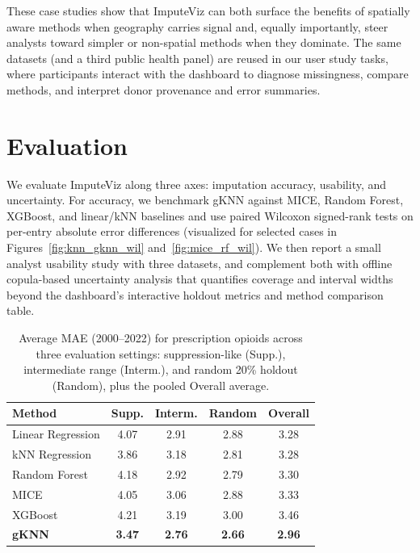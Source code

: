 \documentclass[review]{vgtc}
\newcommand{\gknn}{gKNN\xspace}
\newcommand{\tool}{ImputeViz\xspace}
\begin{document}
These case studies show that ImputeViz can both surface the benefits of spatially aware methods when geography carries signal and, equally importantly, steer analysts toward simpler or non-spatial methods when they dominate. The same datasets (and a third public health panel) are reused in our user study tasks, where participants interact with the dashboard to diagnose missingness, compare methods, and interpret donor provenance and error summaries.

\section{Evaluation}
\label{sec:evaluation}
We evaluate \tool along three axes: imputation accuracy, usability, and uncertainty. For accuracy, we benchmark gKNN against MICE, Random Forest, XGBoost, and linear/kNN baselines and use paired Wilcoxon signed-rank tests on per-entry absolute error differences (visualized for selected cases in Figures~\ref{fig:knn_gknn_wil} and~\ref{fig:mice_rf_wil}). We then report a small analyst usability study with three datasets, and complement both with offline copula-based uncertainty analysis that quantifies coverage and interval widths beyond the dashboard's interactive holdout metrics and method comparison table.

\begin{table}[ht]
  \centering
  \caption{Average MAE (2000--2022) for prescription opioids across three evaluation settings: suppression-like (Supp.), intermediate range (Interm.), and random 20\% holdout (Random), plus the pooled Overall average.}
  \label{tab:metrics}
  \begin{tabular}{@{}lcccc@{}}
    \toprule
    Method & Supp. & Interm. & Random & Overall \\
    \midrule
    Linear Regression & 4.07 & 2.91 & 2.88 & 3.28 \\
    kNN Regression    & 3.86 & 3.18 & 2.81 & 3.28 \\
    Random Forest     & 4.18 & 2.92 & 2.79 & 3.30 \\
    MICE              & 4.05 & 3.06 & 2.88 & 3.33 \\
    XGBoost           & 4.21 & 3.19 & 3.00 & 3.46 \\
    \textbf{\gknn}    & \textbf{3.47} & \textbf{2.76} & \textbf{2.66} & \textbf{2.96} \\
    \bottomrule
  \end{tabular}
\end{table}
\vspace{-8pt}
\end{document}
